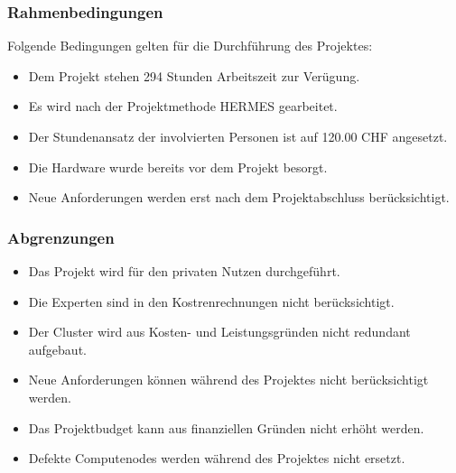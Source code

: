 \subsubsection{Rahmenbedingungen} 
\label{sec:Rahmenbedingungen}

Folgende Bedingungen gelten für die Durchführung des Projektes:
\begin{itemize}
	\item Dem Projekt stehen 294 Stunden Arbeitszeit zur Verügung.
	\item Es wird nach der Projektmethode HERMES gearbeitet.
	\item Der Stundenansatz der involvierten Personen ist auf 120.00 CHF angesetzt.
	\item Die Hardware wurde bereits vor dem Projekt besorgt.
	\item Neue Anforderungen werden erst nach dem Projektabschluss berücksichtigt.
\end{itemize}

\subsubsection{Abgrenzungen} 
\label{sec:Abgrenzungen}
\begin{itemize}
	\item Das Projekt wird für den privaten Nutzen durchgeführt.
	\item Die Experten sind in den Kostrenrechnungen nicht berücksichtigt.
	\item Der Cluster wird aus Kosten- und Leistungsgründen nicht redundant aufgebaut.
	\item Neue Anforderungen können während des Projektes nicht berücksichtigt werden.
	\item Das Projektbudget kann aus finanziellen Gründen nicht erhöht werden.
	\item Defekte Computenodes werden während des Projektes nicht ersetzt.
\end{itemize}